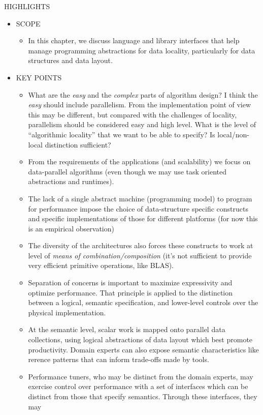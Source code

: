 HIGHLIGHTS
\begin{itemize}
\item SCOPE
  \begin{itemize}
  \item In this chapter, we discuss language and library interfaces that help manage programming abstractions for data locality, particularly for data structures and data layout. 
  \end{itemize}
\item KEY POINTS
  \begin{itemize}
  \item What are the {\em easy} and the {\em complex} parts of algorithm design? I think the {\em easy} should include parallelism. From the implementation point of view this may be different, but compared with the challenges of locality, parallelism should be considered easy and high level. What is the level of ``algorithmic locality'' that we want to be able to specify? Is local/non-local distinction sufficient?
  \item From the requirements of the applications (and scalability) we focus on data-parallel algorithms (even though we may use task oriented abstractions and runtimes).
  \item The lack of a single abstract machine (programming model) to program for performance impose the choice of data-structure specific constructs and specific implementations of those for different platforms (for now this is an empirical observation)
  \item The diversity of the architectures also forces these constructs to work at level of {\em means of combination/composition} (it's not sufficient to provide very efficient primitive operations, like BLAS).
  \item Separation of concerns is important to maximize expressivity and optimize performance.  That principle is applied to the distinction between a logical, semantic specification, and lower-level controls over the physical implementation.
  \item At the semantic level, scalar work is mapped onto parallel data collections, using logical abstractions of data layout which best promote productivity.  Domain experts can also expose semantic characteristics like rerence patterns that can inform trade-offs made by tools.
  \item Performance tuners, who may be distinct from the domain experts, may exercise control over performance with a set of interfaces which can be distinct from those that specify semantics.  Through these interfaces, they may 

\end{itemize}
\end{itemize}
